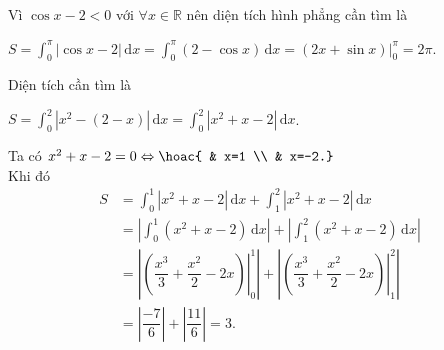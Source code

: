 \begin{bt}
{\begin{listEX}
\begin{center}
			\end{center}
			\item Vì $\cos x-2<0$ với $\forall x\in \mathbb{R}$ nên diện tích hình phẳng cần tìm  là
			\begin{center}
				$S=\displaystyle\int_{0}^{\pi }\left| \cos x-2 \right|\mathrm{\,d}x=\int_{0}^{\pi }\left( 2-\cos x  \right)\mathrm{\,d}x=\left( 2x+\sin x \right) \Big|_{0}^{\pi }=2\pi$.
			\end{center}
			\item Diện  tích cần tìm là
			\begin{center}
				$S=\displaystyle\int_{0}^{2}\left| x^2-\left( 2-x \right) \right|\mathrm{\,d}x=\int_{0}^{2}\left| x^2+x-2 \right|\mathrm{\,d}x$. 
			\end{center}
			Ta có $x^2+x-2=0\Leftrightarrow \hoac{ 
			& x=1 \\ 
			 & x=-2.}$\\
			 Khi đó
			\begin{align*}
				S&=\displaystyle\int_{0}^{1}\left|  x^2+x-2 \right|\mathrm{\,d}x+\int_{1}^{2}\left| x^2+x-2 \right|\mathrm{\,d}x\\
				&=\left| \int_{0}^{1}\left( x^2+x-2 \right)\mathrm{\,d}x \right|+\left| \int_{1}^{2}\left( x^2+x-2 \right)\mathrm{\,d}x \right|\\ 
				&=\left| \left. \left( \dfrac{x^3}{3}+\dfrac{x^2}{2}-2x \right)  \right|_{0}^{1} \right|+\left| \left. \left( \dfrac{x^3}{3}+\dfrac{x^2}{2}-2x \right) \right|_{1}^{2} \right|\\
				&=\left|  \dfrac{-7}{6} \right|+\left| \dfrac{11}{6} \right|=3.
			\end{align*}
		\end{listEX}
	 }
\end{bt}

